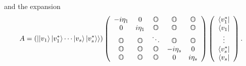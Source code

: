 and the expansion%
\begin{equation}
A=\left( \left\vert \left\vert v_{1}\right\rangle \left\vert v_{1}^{\ast
}\right\rangle \cdots \left\vert v_{s}\right\rangle \left\vert v_{s}^{\ast
}\right\rangle \right\rangle \right) \left( 
\begin{array}{ccccc}
-i\eta _{1} & 0 & {\Bbb O} & {\Bbb O} & {\Bbb O} \\ 
0 & i\eta _{1} & {\Bbb O} & {\Bbb O} & {\Bbb O} \\ 
{\Bbb O} & {\Bbb O} & \ddots & {\Bbb O} & {\Bbb O} \\ 
{\Bbb O} & {\Bbb O} & {\Bbb O} & -i\eta _{s} & 0 \\ 
{\Bbb O} & {\Bbb O} & {\Bbb O} & 0 & i\eta _{s}%
\end{array}%
\right) \left( 
\begin{array}{c}
\left\langle v_{1}^{\ast }\right\vert \\ 
\left\langle v_{1}\right\vert \\ 
\vdots \\ 
\left\langle v_{s}^{\ast }\right\vert \\ 
\left\langle v_{s}\right\vert%
\end{array}%
\right) .
\end{equation}

